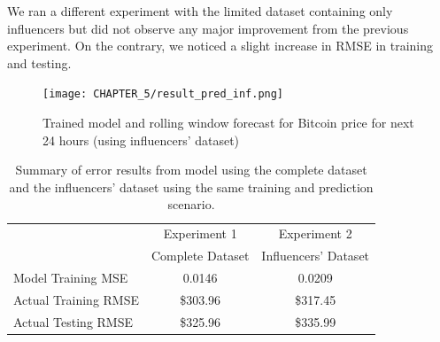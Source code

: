\noindent We ran a different experiment with the limited dataset containing only influencers but did not observe any major improvement from the previous experiment. On the contrary, we noticed a slight increase in RMSE in training and testing. \vspace{5mm}

\begin{figure}[H]
   \centering
   \texttt{[image: CHAPTER\_5/result\_pred\_inf.png]}
   \caption{Trained model and rolling window forecast for Bitcoin price for next 24 hours (using influencers' dataset)}
   \label{result_pred_inf}
\end{figure}
\begin{table}[H]
    \begin{center}
        \begin{tabular}{l |c |c }
        \label{result_summary}
            
              & Experiment 1 & Experiment 2\\ &Complete Dataset & Influencers' Dataset\\
            \hline
            Model Training MSE & 0.0146 & 0.0209 \\
            
            Actual Training RMSE & \$303.96 & \$317.45\\
            Actual Testing RMSE & \$325.96 & \$335.99\\

        \end{tabular}
        \caption{Summary of error results from model using the complete dataset and the influencers' dataset using the same training and prediction scenario.}
    \end{center}
\end{table}\vspace{5mm}

    
